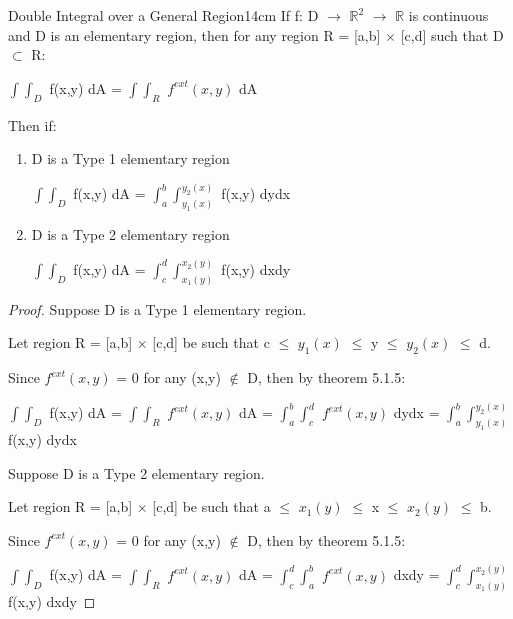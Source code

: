     \vspace{0.5cm}



    \begin{wtheorem}{Double Integral over a General Region}{14cm}
        If f: D $\rightarrow$ $\mathbb{R}^2$ $\rightarrow$ $\mathbb{R}$
        is continuous and D is an elementary region, then
        for any region R = [a,b] $\times$ [c,d] such that D $\subset$ R:

        \hspace{0.5cm}
        $\int \int_D$ f(x,y) dA
        = $\int \int_R$ $f^{ext}(x,y)$ dA

        Then if:

        \begin{enumerate}[label=(\alph*), leftmargin=1cm, itemsep=0.1cm]
            \item D is a Type 1 elementary region
            
                \hspace{0.5cm}
                $\int \int_D$ f(x,y) dA
                = $\int_a^b \int_{y_1(x)}^{y_2(x)}$ f(x,y) dydx

            \item D is a Type 2 elementary region
            
                \hspace{0.5cm}
                $\int \int_D$ f(x,y) dA
                = $\int_c^d \int_{x_1(y)}^{x_2(y)}$ f(x,y) dxdy
        \end{enumerate}
    \end{wtheorem}

    \begin{proof}
        Suppose D is a Type 1 elementary region.

        Let region R = [a,b] $\times$ [c,d] be such that
        c $\leq$ $y_1(x)$ $\leq$ y $\leq$ $y_2(x)$ $\leq$ d.

        Since $f^{ext}(x,y)$ = 0 for any
        (x,y) $\not \in$ D, then by {\color{red} theorem 5.1.5}:

        \hspace{0.2cm}
        $\int \int_D$ f(x,y) dA
        = $\int \int_R$ $f^{ext}(x,y)$ dA
        = $\int_a^b \int_c^d$ $f^{ext}(x,y)$ dydx
        = $\int_a^b \int_{y_1(x)}^{y_2(x)}$ f(x,y) dydx

        \vspace{0.3cm}

        Suppose D is a Type 2 elementary region.

        Let region R = [a,b] $\times$ [c,d] be such that
        a $\leq$ $x_1(y)$ $\leq$ x $\leq$ $x_2(y)$ $\leq$ b.

        Since $f^{ext}(x,y)$ = 0 for any
        (x,y) $\not \in$ D, then by {\color{red} theorem 5.1.5}:

        \hspace{0.2cm}
        $\int \int_D$ f(x,y) dA
        = $\int \int_R$ $f^{ext}(x,y)$ dA
        = $\int_c^d \int_a^b$ $f^{ext}(x,y)$ dxdy
        = $\int_c^d \int_{x_1(y)}^{x_2(y)}$ f(x,y) dxdy
    \end{proof}

